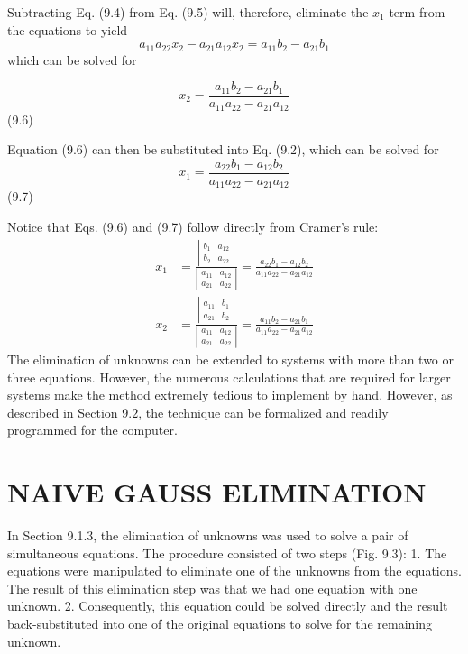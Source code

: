 \documentclass[../main.tex]{subfiles}
\begin{document}
Subtracting Eq. (9.4) from Eq. (9.5) will, therefore, eliminate the $x_{1}$ term from the equations to yield
$$
a_{11} a_{22} x_{2}-a_{21} a_{12} x_{2}=a_{11} b_{2}-a_{21} b_{1}
$$
which can be solved for

$$
x_{2}=\frac{a_{11} b_{2}-a_{21} b_{1}}{a_{11} a_{22}-a_{21} a_{12}}
$$ \hfill{(9.6)}

Equation (9.6) can then be substituted into Eq. (9.2), which can be solved for
$$
x_{1}=\frac{a_{22} b_{1}-a_{12} b_{2}}{a_{11} a_{22}-a_{21} a_{12}}
$$\hfill{(9.7)}

Notice that Eqs. (9.6) and (9.7) follow directly from Cramer's rule:
$$
\begin{aligned}
x_{1} &=\frac{\left|\begin{array}{ll}
b_{1} & a_{12} \\
b_{2} & a_{22}
\end{array}\right|}{\left|\begin{array}{ll}
a_{11} & a_{12} \\
a_{21} & a_{22}
\end{array}\right|}=\frac{a_{22} b_{1}-a_{12} b_{2}}{a_{11} a_{22}-a_{21} a_{12}} \\
x_{2} &=\frac{\left|\begin{array}{ll}
a_{11} & b_{1} \\
a_{21} & b_{2}
\end{array}\right|}{\left|\begin{array}{ll}
a_{11} & a_{12} \\
a_{21} & a_{22}
\end{array}\right|}=\frac{a_{11} b_{2}-a_{21} b_{1}}{a_{11} a_{22}-a_{21} a_{12}}
\end{aligned}
$$
The elimination of unknowns can be extended to systems with more than two or three equations. However, the numerous calculations that are required for larger systems make the method extremely tedious to implement by hand. However, as described in Section $9.2$, the technique can be formalized and readily programmed for the computer.
\bigskip

\section{NAIVE GAUSS ELIMINATION}

In Section 9.1.3, the elimination of unknowns was used to solve a pair of simultaneous equations. The procedure consisted of two steps (Fig. 9.3):
1. The equations were manipulated to eliminate one of the unknowns from the equations. The result of this elimination step was that we had one equation with one unknown.
2. Consequently, this equation could be solved directly and the result back-substituted into one of the original equations to solve for the remaining unknown.
\end{document}
